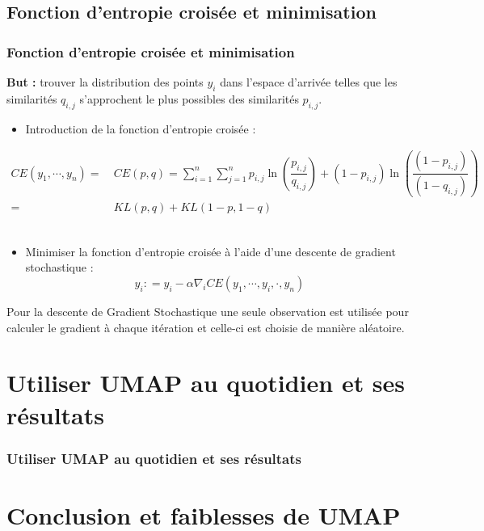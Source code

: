 \documentclass{beamer}
\theoremstyle{definition}
\begin{document}
\subsection{Fonction d'entropie croisée et minimisation}
\begin{frame}
	\frametitle{Fonction d'entropie croisée et minimisation}

	\textcolor{modernvert}{\textbf{But :}} trouver la distribution des points $y_i$ dans l'espace d'arrivée telles que les similarités $q_{i,j}$ s'approchent le plus possibles des similarités $p_{i,j}$.
	\begin{itemize}
		\item Introduction de la fonction d’entropie croisée : 
		
	\end{itemize}
\begin{align*}
	CE(y_1,\cdots,y_n) =& \ CE(p,q) = \sum_{i=1}^{n}\sum_{j=1}^{n}p_{i,j}\ln\left(\dfrac{p_{i,j}}{q_{i,j}}\right) + (1-p_{i,j})\ln\left(\dfrac{(1-p_{i,j})}{(1 - q_{i,j})}\right)\\
	=&\  KL(p,q) + KL(1-p,1-q)
\end{align*}\quad\\[-0.25cm]
\begin{itemize}
		
		\item Minimiser la fonction d'entropie croisée à l'aide d'une descente de gradient stochastique :\\[-0.25cm]
		
		$$y_i : = y_i -\alpha \nabla_iCE (y_1,\cdots,y_i,\cdot,y_n)$$
		 
	\end{itemize}
	
		Pour la descente de Gradient Stochastique une seule observation est utilisée pour calculer le gradient à chaque itération et celle-ci est choisie de manière aléatoire.
	
\end{frame}


\section{Utiliser UMAP au quotidien et ses résultats}
\begin{frame}
	\frametitle{Utiliser UMAP au quotidien et ses résultats}
	
	
\end{frame}

\section{Conclusion et faiblesses de UMAP}
\end{document}
